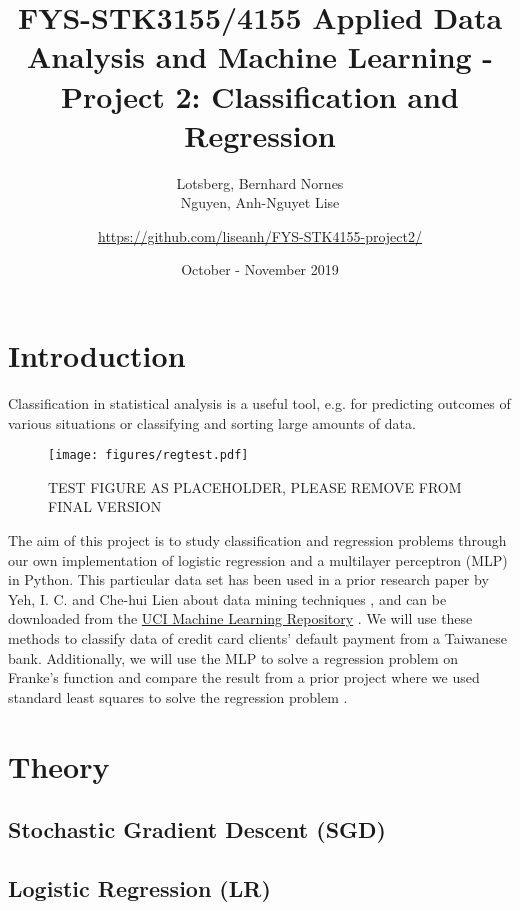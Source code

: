 \documentclass[a4paper, 11pt, twocolumn]{article}
\title{FYS-STK3155/4155 Applied Data Analysis and Machine Learning - Project 2: Classification and Regression }
\author{Lotsberg, Bernhard Nornes \\ Nguyen, Anh-Nguyet Lise \and \url{https://github.com/liseanh/FYS-STK4155-project2/}}
\date{October - November 2019}
\begin{document}

\section{Introduction}
Classification in statistical analysis is a useful tool, e.g. for predicting outcomes of various situations or classifying and sorting large amounts of data. 
\begin{figure}[H]
	\texttt{[image: figures/regtest.pdf]}
	\caption{TEST FIGURE AS PLACEHOLDER, PLEASE REMOVE FROM FINAL VERSION}
\end{figure}

The aim of this project is  to study classification and regression problems through our own implementation of logistic regression and a multilayer perceptron (MLP) in Python. This particular data set has been used in a prior research paper by Yeh, I. C. and Che-hui Lien about data mining techniques \cite{origarticle}, and can be downloaded from the \href{https://archive.ics.uci.edu/ml/datasets/default+of+credit+card+clients}{UCI Machine Learning Repository} \cite{UCI}.
We will use these methods to classify data of credit card clients' default payment from a Taiwanese bank. Additionally, we will use the MLP to solve a regression problem on Franke's function and compare the result from a prior project where we used standard least squares to solve the regression problem \cite{regpaper}.  


\section{Theory}
\subsection{Stochastic Gradient Descent (SGD)}
\the \columnwidth

\subsection{Logistic Regression (LR)}
\end{document}
